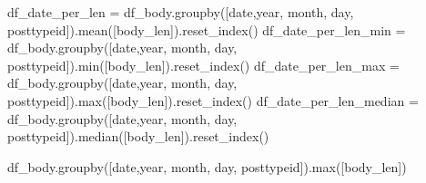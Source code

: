\documentclass[
  letterpaper,
  DIV=11,
  numbers=noendperiod]{scrartcl}
\newenvironment{Shaded}{\begin{snugshade}}{\end{snugshade}}
\newcommand{\BuiltInTok}[1]{\textcolor[rgb]{0.00,0.23,0.31}{#1}}
\newcommand{\NormalTok}[1]{\textcolor[rgb]{0.00,0.23,0.31}{#1}}
\newcommand{\OperatorTok}[1]{\textcolor[rgb]{0.37,0.37,0.37}{#1}}
\newcommand{\StringTok}[1]{\textcolor[rgb]{0.13,0.47,0.30}{#1}}
\begin{document}
\begin{Shaded}
\begin{Highlighting}[]
\NormalTok{df\_date\_per\_len }\OperatorTok{=}\NormalTok{ df\_body.groupby([}\StringTok{\textquotesingle{}date\textquotesingle{}}\NormalTok{,}\StringTok{\textquotesingle{}year\textquotesingle{}}\NormalTok{, }\StringTok{\textquotesingle{}month\textquotesingle{}}\NormalTok{, }\StringTok{\textquotesingle{}day\textquotesingle{}}\NormalTok{, }\StringTok{\textquotesingle{}posttypeid\textquotesingle{}}\NormalTok{]).mean([}\StringTok{\textquotesingle{}body\_len\textquotesingle{}}\NormalTok{]).reset\_index()}
\NormalTok{df\_date\_per\_len\_min }\OperatorTok{=}\NormalTok{ df\_body.groupby([}\StringTok{\textquotesingle{}date\textquotesingle{}}\NormalTok{,}\StringTok{\textquotesingle{}year\textquotesingle{}}\NormalTok{, }\StringTok{\textquotesingle{}month\textquotesingle{}}\NormalTok{, }\StringTok{\textquotesingle{}day\textquotesingle{}}\NormalTok{, }\StringTok{\textquotesingle{}posttypeid\textquotesingle{}}\NormalTok{]).}\BuiltInTok{min}\NormalTok{([}\StringTok{\textquotesingle{}body\_len\textquotesingle{}}\NormalTok{]).reset\_index()}
\NormalTok{df\_date\_per\_len\_max }\OperatorTok{=}\NormalTok{ df\_body.groupby([}\StringTok{\textquotesingle{}date\textquotesingle{}}\NormalTok{,}\StringTok{\textquotesingle{}year\textquotesingle{}}\NormalTok{, }\StringTok{\textquotesingle{}month\textquotesingle{}}\NormalTok{, }\StringTok{\textquotesingle{}day\textquotesingle{}}\NormalTok{, }\StringTok{\textquotesingle{}posttypeid\textquotesingle{}}\NormalTok{]).}\BuiltInTok{max}\NormalTok{([}\StringTok{\textquotesingle{}body\_len\textquotesingle{}}\NormalTok{]).reset\_index()}
\NormalTok{df\_date\_per\_len\_median }\OperatorTok{=}\NormalTok{ df\_body.groupby([}\StringTok{\textquotesingle{}date\textquotesingle{}}\NormalTok{,}\StringTok{\textquotesingle{}year\textquotesingle{}}\NormalTok{, }\StringTok{\textquotesingle{}month\textquotesingle{}}\NormalTok{, }\StringTok{\textquotesingle{}day\textquotesingle{}}\NormalTok{, }\StringTok{\textquotesingle{}posttypeid\textquotesingle{}}\NormalTok{]).median([}\StringTok{\textquotesingle{}body\_len\textquotesingle{}}\NormalTok{]).reset\_index()}
\end{Highlighting}
\end{Shaded}

\begin{Shaded}
\begin{Highlighting}[]
\NormalTok{df\_body.groupby([}\StringTok{\textquotesingle{}date\textquotesingle{}}\NormalTok{,}\StringTok{\textquotesingle{}year\textquotesingle{}}\NormalTok{, }\StringTok{\textquotesingle{}month\textquotesingle{}}\NormalTok{, }\StringTok{\textquotesingle{}day\textquotesingle{}}\NormalTok{, }\StringTok{\textquotesingle{}posttypeid\textquotesingle{}}\NormalTok{]).}\BuiltInTok{max}\NormalTok{([}\StringTok{\textquotesingle{}body\_len\textquotesingle{}}\NormalTok{])}
\end{Highlighting}
\end{Shaded}
\end{document}
